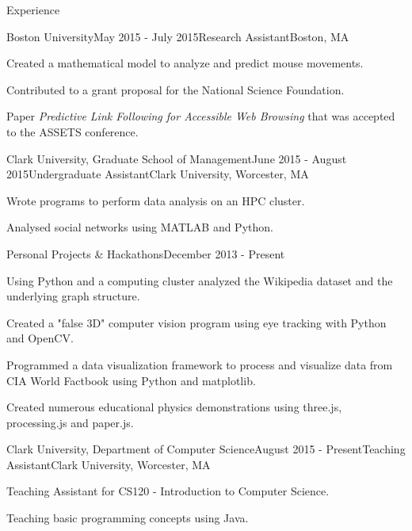 \documentclass{resume} %
\begin{document}
\begin{rSection}{Experience}

\begin{rSubsection}{Boston University}{May 2015 - July 2015}{Research Assistant}{Boston, MA}
\item Created a mathematical model to analyze and predict mouse movements.
\item Contributed to a grant proposal for the National Science Foundation.
\item Paper \emph{Predictive Link Following for Accessible Web Browsing} that was accepted to the ASSETS conference.
\end{rSubsection}


\begin{rSubsection}{Clark University, Graduate School of Management}{June 2015 - August 2015}{Undergraduate Assistant}{Clark University, Worcester, MA}
\item Wrote programs to perform data analysis on an HPC cluster.
\item Analysed social networks using MATLAB and Python.
\end{rSubsection}


\begin{rSubsection}{Personal Projects \& Hackathons}{December 2013 - Present}{}{}
\begin{multicols}{2}
\item Using Python and a computing cluster analyzed the Wikipedia dataset and the underlying graph
structure.
\item Created a "false 3D" computer vision program using eye tracking with Python and OpenCV.
\item Programmed a data visualization framework to process and visualize data from CIA World Factbook using Python and matplotlib.
\item Created numerous educational physics demonstrations using three.js, processing.js and paper.js.
\end{multicols}
\end{rSubsection}


\begin{rSubsection}{Clark University, Department of Computer Science}{August 2015 - Present}{Teaching Assistant}{Clark University, Worcester, MA}
\item Teaching Assistant for CS120 - Introduction to Computer Science.
\item Teaching basic programming concepts using Java.
\end{rSubsection}

\end{rSection}
\end{document}
